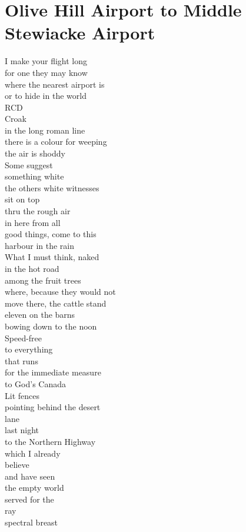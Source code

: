 \documentclass[smalldemyvopaper,11pt,twoside,onecolumn,openright,extrafontsizes]{memoir}
\begin{document}
\chapter{Olive Hill Airport to Middle Stewiacke Airport}
I make your flight long
\\for one they may know
\\where the nearest airport is
\\or to hide in the world
\\RCD
\\Croak
\\in the long roman line
\\there is a colour for weeping
\\the air is shoddy
\\Some suggest
\\something white
\\the others white witnesses
\\sit on top
\\thru the rough air
\\in here from all
\\good things, come to this
\\harbour in the rain
\\What I must think, naked
\\in the hot road
\\among the fruit trees
\\where, because they would not
\\move there, the cattle stand
\\eleven on the barns
\\bowing down to the noon
\\Speed-free
\\to everything
\\that runs
\\for the immediate measure
\\to God's Canada
\\Lit fences
\\pointing behind the desert
\\lane
\\last night
\\to the Northern Highway
\\which I already
\\believe
\\and have seen
\\the empty world
\\served for the
\\ray
\\spectral breast
\end{document}
